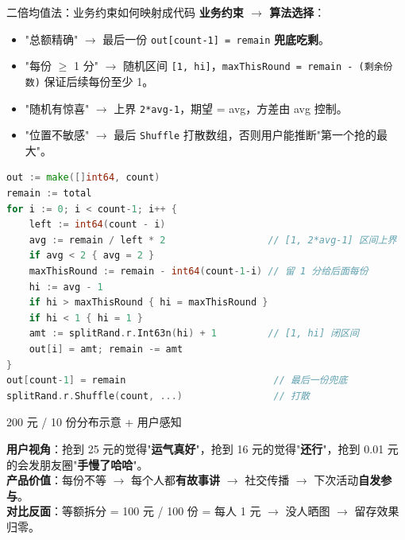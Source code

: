 \documentclass[aspectratio=169,11pt]{beamer}
\begin{document}
\begin{frame}{二倍均值法：业务约束如何映射成代码}
\small \textbf{业务约束 $\to$ 算法选择}：
\begin{itemize}\itemsep0pt
  \item "总额精确" $\to$ 最后一份 \texttt{out[count-1] = remain} \textbf{兜底吃剩}。
  \item "每份 $\geq$ 1 分" $\to$ 随机区间 \texttt{[1, hi]}，\texttt{maxThisRound = remain - (剩余份数)} 保证后续每份至少 1。
  \item "随机有惊喜" $\to$ 上界 \texttt{2*avg-1}，期望 = avg，方差由 avg 控制。
  \item "位置不敏感" $\to$ 最后 \texttt{Shuffle} 打散数组，否则用户能推断"第一个抢的最大"。
\end{itemize}
\begin{lstlisting}[language=Go,firstnumber=107,
  caption={}]
out := make([]int64, count)
remain := total
for i := 0; i < count-1; i++ {
    left := int64(count - i)
    avg := remain / left * 2                  // [1, 2*avg-1] 区间上界
    if avg < 2 { avg = 2 }
    maxThisRound := remain - int64(count-1-i) // 留 1 分给后面每份
    hi := avg - 1
    if hi > maxThisRound { hi = maxThisRound }
    if hi < 1 { hi = 1 }
    amt := splitRand.r.Int63n(hi) + 1         // [1, hi] 闭区间
    out[i] = amt; remain -= amt
}
out[count-1] = remain                          // 最后一份兜底
splitRand.r.Shuffle(count, ...)                // 打散
\end{lstlisting}
\end{frame}

\begin{frame}[shrink]{200 元 / 10 份分布示意 + 用户感知}
\vspace{2mm}

\small \textbf{用户视角}：抢到 25 元的觉得"\textbf{运气真好}"，抢到 16 元的觉得"\textbf{还行}"，抢到 0.01 元的会发朋友圈"\textbf{手慢了哈哈}"。\\
\textbf{产品价值}：每份不等 $\to$ 每个人都\textbf{有故事讲} $\to$ 社交传播 $\to$ 下次活动\textbf{自发参与}。\\
\textbf{对比反面}：等额拆分 = 100 元 / 100 份 = 每人 1 元 $\to$ 没人晒图 $\to$ 留存效果归零。
\end{frame}
\end{document}
